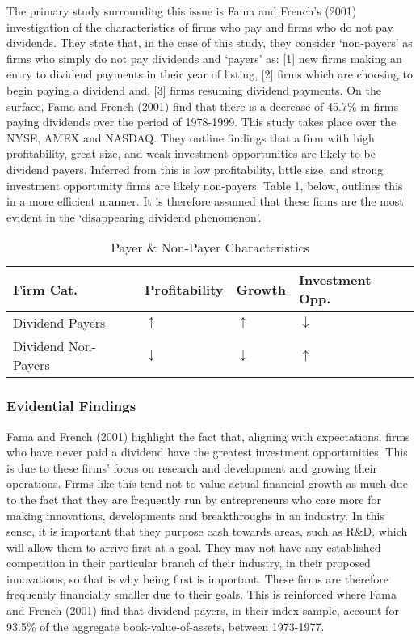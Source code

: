 \documentclass[11pt, english]{article}
\begin{document}
	The primary study surrounding this issue is Fama and French's (2001) investigation of the characteristics of firms who pay and firms who do not pay dividends. They state that, in the case of this study, they consider `non-payers' as firms who simply do not pay dividends and `payers' as: [1] new firms making an entry to dividend payments in their year of listing, [2] firms which are choosing to begin paying a dividend and, [3] firms resuming dividend payments. On the surface, Fama and French (2001) find that there is a decrease of 45.7\% in firms paying dividends over the period of 1978-1999. This study takes place over the NYSE, AMEX and NASDAQ. They outline findings that a firm with high profitability, great size, and weak investment opportunities are likely to be dividend payers. Inferred from this is low profitability, little size, and strong investment opportunity firms are likely non-payers. Table 1, below, outlines this in a more efficient manner. It is therefore assumed that these firms are the most evident in the `disappearing dividend phenomenon'.\\

	\begin{table}[h]
		\scriptsize
	\begin{center}
	\begin{tabular}{p{3.5cm}p{2.5cm}p{2.5cm}p{2.5cm}}
		\textbf{Firm Cat.} & \textbf{Profitability} & \textbf{Growth} & \textbf{Investment Opp.}\\
		\hline
		Dividend Payers & $\uparrow$ & $\uparrow$ & $\downarrow$\\
		Dividend Non-Payers & $\downarrow$ & $\downarrow$ & $\uparrow$\\
		\hline
	\end{tabular}
		\caption{Payer \& Non-Payer Characteristics}
	\end{center}
	\end{table}

		\newpage

		\subsubsection*{Evidential Findings}

	Fama and French (2001) highlight the fact that, aligning with expectations, firms who have never paid a dividend have the greatest investment opportunities. This is due to these firms' focus on research and development and growing their operations. Firms like this tend not to value actual financial growth as much due to the fact that they are frequently run by entrepreneurs who care more for making innovations, developments and breakthroughs in an industry. In this sense, it is important that they purpose cash towards areas, such as R\&D, which will allow them to arrive first at a goal. They may not have any established competition in their particular branch of their industry, in their proposed innovations, so that is why being first is important. These firms are therefore frequently financially smaller due to their goals. This is reinforced where Fama and French (2001) find that dividend payers, in their index sample, account for 93.5\% of the aggregate book-value-of-assets, between 1973-1977.\\
\end{document}
